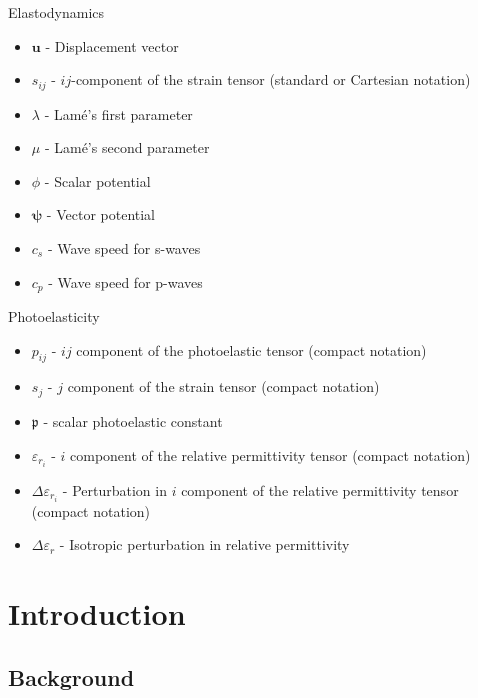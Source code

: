 \documentclass[11pt,twoside]{eitExjobb}
\begin{document}
		Elastodynamics
		\begin{itemize}
			\item $\bm{u}$ - Displacement vector
			\item $s_{ij}$ - $ij$-component of the strain tensor (standard or Cartesian notation)
			\item $\lambda$ - Lamé's first parameter
			\item $\mu$ - Lamé's second parameter
			\item $\phi$ - Scalar potential
			\item $\bm{\psi}$ - Vector potential
			\item $c_s$ - Wave speed for s-waves
			\item $c_p$ - Wave speed for p-waves
		\end{itemize}
		Photoelasticity
		\begin{itemize}
			\item $p_{ij}$ - $ij$ component of the photoelastic tensor (compact notation)
			\item $s_j$ - $j$ component of the strain tensor (compact notation)
			\item $\mathfrak{p}$ - scalar photoelastic constant
			\item $\varepsilon_{r_i}$ - $i$ component of the relative permittivity tensor (compact notation)
			\item $\Delta \varepsilon_{r_i}$ - Perturbation in $i$ component of the relative permittivity tensor (compact notation)
			\item $\Delta \varepsilon_r$ - Isotropic perturbation in relative permittivity
		\end{itemize}
	
	\cleardoublepage
	
	\mainmatter		%
	
	\chapter{Introduction \label{ch:intro}}
	
	\section{Background}
	
\end{document}
